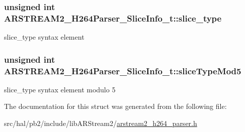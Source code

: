 \subsubsection[{\texorpdfstring{slice\+\_\+type}{slice_type}}]{\setlength{\rightskip}{0pt plus 5cm}unsigned int A\+R\+S\+T\+R\+E\+A\+M2\+\_\+\+H264\+Parser\+\_\+\+Slice\+Info\+\_\+t\+::slice\+\_\+type}\hypertarget{struct_a_r_s_t_r_e_a_m2___h264_parser___slice_info__t_aa356d4557369811687d754ef99ec4fd2}{}\label{struct_a_r_s_t_r_e_a_m2___h264_parser___slice_info__t_aa356d4557369811687d754ef99ec4fd2}
slice\+\_\+type syntax element 
\subsubsection[{\texorpdfstring{slice\+Type\+Mod5}{sliceTypeMod5}}]{\setlength{\rightskip}{0pt plus 5cm}unsigned int A\+R\+S\+T\+R\+E\+A\+M2\+\_\+\+H264\+Parser\+\_\+\+Slice\+Info\+\_\+t\+::slice\+Type\+Mod5}\hypertarget{struct_a_r_s_t_r_e_a_m2___h264_parser___slice_info__t_af957e9ced225bf8e36d89a718d79fdfe}{}\label{struct_a_r_s_t_r_e_a_m2___h264_parser___slice_info__t_af957e9ced225bf8e36d89a718d79fdfe}
slice\+\_\+type syntax element modulo 5 

The documentation for this struct was generated from the following file\+:\begin{DoxyCompactItemize}
\item 
src/hal/pb2/include/lib\+A\+R\+Stream2/\hyperlink{arstream2__h264__parser_8h}{arstream2\+\_\+h264\+\_\+parser.\+h}\end{DoxyCompactItemize}
